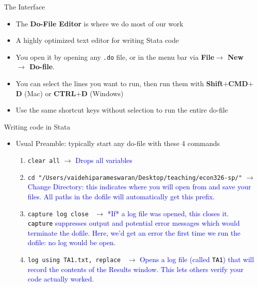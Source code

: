 \documentclass[11pt,notes=hide,aspectratio=169,mathserif]{beamer}
\begin{document}
\begin{frame}{The Interface}
    \begin{itemize}
    \item The \textbf{Do-File Editor} is where we do most of our work
    \item A highly optimized text editor for writing Stata code
    \item You open it by opening any \texttt{.do} file, or in the menu bar via \textbf{File$\rightarrow$ New $\rightarrow$ Do-file}.
    \item You can select the lines you want to run, then run them with \textbf{Shift$+$CMD$+$D} (Mac) or \textbf{CTRL$+$D} (Windows)
    \item Use the same shortcut keys without selection to run the entire do-file
    \end{itemize}
\end{frame}

\begin{frame}{Writing code in Stata}
    \begin{itemize}
        \item Usual Preamble: typically start any do-file with these 4 commands\smallskip
        \begin{enumerate}
            \item  \texttt{clear all} $\rightarrow$ \textcolor{blue}{Drops all variables}\smallskip
            \item  \texttt{cd "/Users/vaidehiparameswaran/Desktop/teaching/econ326-sp/"} $\rightarrow$ \textcolor{blue}{Change Directory: this indicates where you will open from and save your files. All paths in the dofile will automatically get this prefix.}\smallskip
            \item \texttt{capture log close } $\rightarrow$ \textcolor{blue}{*If* a log file was opened, this closes it. \textcolor{black}{\texttt{capture}} suppresses output and potential error messages which would terminate the dofile. Here, we'd get an error the first time we run the dofile: no log would be open.}\smallskip
            \item \texttt{log using TA1.txt, replace } $\rightarrow$ \textcolor{blue}{Opens a log file (called \textcolor{black}{\texttt{TA1}}) that will record the contents of the Results window. This lets others verify your code actually worked. }\smallskip
        \end{enumerate}
    \end{itemize}
\end{frame}
\end{document}

